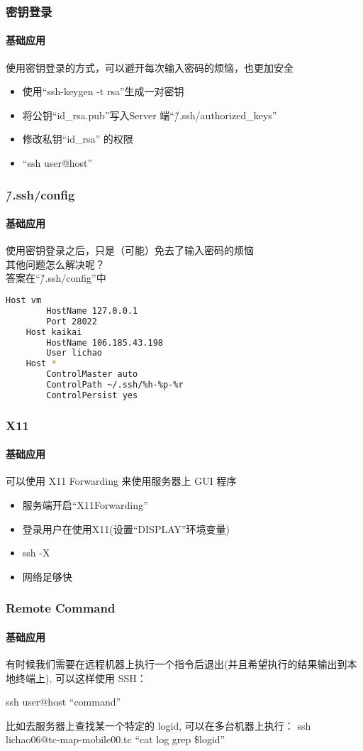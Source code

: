 \begin{frame}[fragile]
  \frametitle{密钥登录}
  \framesubtitle{基础应用}
  使用密钥登录的方式，可以避开每次输入密码的烦恼，也更加安全
  \begin{itemize}
  \item 使用``ssh-keygen -t rsa''生成一对密钥
  \item 将公钥``id\_rsa.pub''写入Server 端``\~/.ssh/authorized\_keys''
  \item 修改私钥``id\_rsa'' 的权限
  \item ``ssh user@host''
  \end{itemize}
\end{frame}

\begin{frame}[fragile]
  \frametitle{\~/.ssh/config}
  \framesubtitle{基础应用}
  使用密钥登录之后，只是（可能）免去了输入密码的烦恼 \\
  其他问题怎么解决呢？ \\
  \vspace{\baselineskip}
  \pause
  答案在``\~/.ssh/config''中
  \begin{lstlisting}[language=bash]
    Host vm
        HostName 127.0.0.1
        Port 28022
    Host kaikai
        HostName 106.185.43.198
        User lichao
    Host *
        ControlMaster auto
        ControlPath ~/.ssh/%h-%p-%r
        ControlPersist yes
  \end{lstlisting}
\end{frame}

\begin{frame}[fragile]
  \frametitle{X11}
  \framesubtitle{基础应用}

  可以使用 X11 Forwarding 来使用服务器上 GUI 程序
  \begin{itemize}
  \item 服务端开启``X11Forwarding''
  \item 登录用户在使用X11(设置``DISPLAY''环境变量)
  \item ssh -X
  \item 网络足够快
  \end{itemize}
\end{frame}


\begin{frame}[fragile]
  \frametitle{Remote Command}
  \framesubtitle{基础应用}

  有时候我们需要在远程机器上执行一个指令后退出(并且希望执行的结果输出到本地终端上), 可以这样使用 SSH：

  \vspace{\baselineskip}
  ssh user@host ``command''
  \vspace{\baselineskip}

  \pause
  比如去服务器上查找某一个特定的 logid, 可以在多台机器上执行：
  \vspace{\baselineskip}
  ssh lichao06@tc-map-mobile00.tc ``cat log \textbar{} grep \$logid''

\end{frame}

